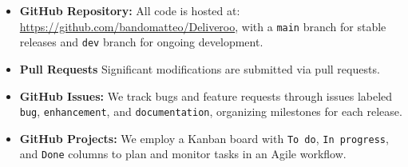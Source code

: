 \begin{itemize}
  \item \textbf{GitHub Repository:} All code is hosted at: \url{https://github.com/bandomatteo/Deliveroo}, with a \texttt{main} branch for stable releases and \texttt{dev} branch for ongoing development.
  \item \textbf{Pull Requests} Significant modifications are submitted via pull requests.
  \item \textbf{GitHub Issues:} We track bugs and feature requests through issues labeled \texttt{bug}, \texttt{enhancement}, and \texttt{documentation}, organizing milestones for each release.
  \item \textbf{GitHub Projects:} We employ a Kanban board with \texttt{To do}, \texttt{In progress}, and \texttt{Done} columns to plan and monitor tasks in an Agile workflow.
\end{itemize}